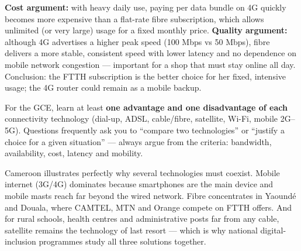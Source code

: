 \documentclass[11pt]{article}
\newcommand{\cle}[1]{{\popxbold\color{popdark}#1}}
\begin{document}
\begin{corrige}[Exercise 1]
\textbf{Cost argument:} with heavy daily use, paying per data bundle on 4G quickly becomes more expensive than a flat-rate fibre subscription, which allows unlimited (or very large) usage for a fixed monthly price. \textbf{Quality argument:} although 4G advertises a higher peak speed (100 Mbps vs 50 Mbps), fibre delivers a more stable, consistent speed with lower latency and no dependence on mobile network congestion --- important for a shop that must stay online all day. Conclusion: the FTTH subscription is the better choice for her fixed, intensive usage; the 4G router could remain as a mobile backup.
\end{corrige}

\begin{attention}
For the GCE, learn at least \textbf{one advantage and one disadvantage of each} connectivity technology (dial-up, ADSL, cable/fibre, satellite, Wi-Fi, mobile 2G--5G). Questions frequently ask you to ``compare two technologies'' or ``justify a choice for a given situation'' --- always argue from the criteria: \cle{bandwidth}, \cle{availability}, \cle{cost}, \cle{latency} and \cle{mobility}.
\end{attention}

\begin{savaistu}
Cameroon illustrates perfectly why several technologies must coexist. Mobile internet (3G/4G) dominates because smartphones are the main device and mobile masts reach far beyond the wired network. Fibre concentrates in Yaoundé and Douala, where CAMTEL, MTN and Orange compete on FTTH offers. And for rural schools, health centres and administrative posts far from any cable, satellite remains the technology of last resort --- which is why national digital-inclusion programmes study all three solutions together.
\end{savaistu}
\end{document}
